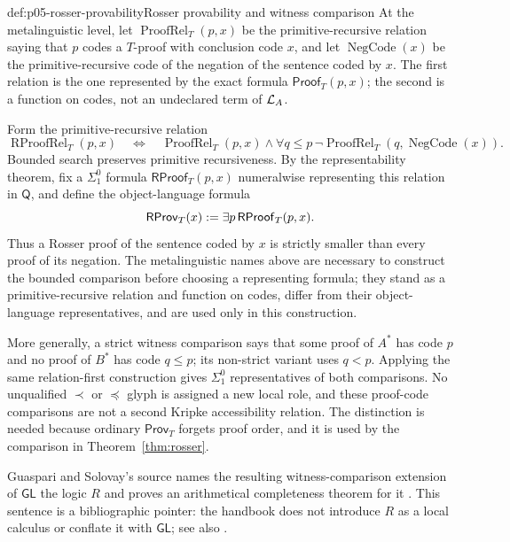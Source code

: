 \begin{hbdefinition}{def:p05-rosser-provability}{Rosser provability and witness comparison}
At the metalinguistic level, let
\(\operatorname{ProofRel}_T(p,x)\) be the primitive-recursive relation saying
that \(p\) codes a \(T\)-proof with conclusion code \(x\), and let
\(\operatorname{NegCode}(x)\) be the primitive-recursive code of the negation
of the sentence coded by \(x\).  The first relation is the one represented by
the exact formula \(\mathsf{Proof}_T(p,x)\); the second is a function on
codes, not an undeclared term of \(\mathcal{L}_A\).

Form the primitive-recursive relation
\[
 \operatorname{RProofRel}_T(p,x)
 \quad\Longleftrightarrow\quad
 \operatorname{ProofRel}_T(p,x)\land
 \forall q\leq p\,
   \neg\operatorname{ProofRel}_T
      (q,\operatorname{NegCode}(x)).
\]
Bounded search preserves primitive recursiveness.  By the representability
theorem, fix a \(\Sigma^0_1\) formula
\(\mathsf{RProof}_T(p,x)\) numeralwise representing this relation in
\(\mathsf Q\), and define the object-language formula
\[
 \mathsf{RProv}_T(x)\mathrel{:=}\exists p\,\mathsf{RProof}_T(p,x).
\]
Thus a Rosser proof of the sentence coded by \(x\) is strictly smaller than
every proof of its negation.  The metalinguistic names above are necessary to
construct the bounded comparison before choosing a representing formula; they
stand as a primitive-recursive relation and function on codes, differ from
their object-language representatives, and are used only in this construction.

More generally, a strict witness comparison says that some proof of \(A^*\)
has code \(p\) and no proof of \(B^*\) has code \(q\leq p\); its non-strict
variant uses \(q<p\).  Applying the same relation-first construction gives
\(\Sigma^0_1\) representatives of both comparisons.  No unqualified
\(\prec\) or \(\preccurlyeq\) glyph is assigned a new local role, and these
proof-code comparisons are not a second Kripke accessibility relation.  The
distinction is needed because ordinary \(\mathsf{Prov}_T\) forgets proof
order, and it is used by the comparison in Theorem~\ref{thm:rosser}.

Guaspari and Solovay's source names the resulting witness-comparison extension
of \(\mathsf{GL}\) the logic \(R\) and proves an arithmetical completeness
theorem for it \cite{GuaspariSolovay1979}.  This sentence is a bibliographic
pointer: the handbook does not introduce \(R\) as a local calculus or conflate
it with \(\mathsf{GL}\); see also \cite{Lindstrom2003}.
\end{hbdefinition}

